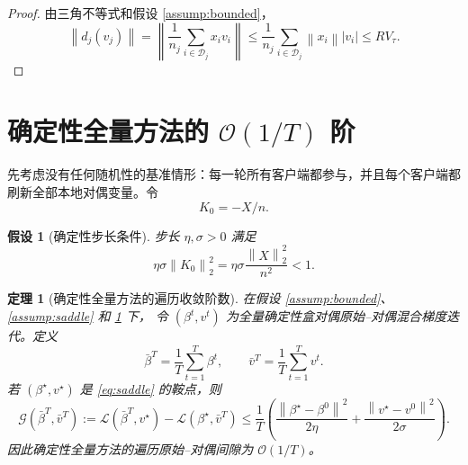 \documentclass[UTF8,a4paper,11pt]{ctexart}
\newtheorem{assumption}{假设}
\newtheorem{theorem}{定理}
\newcommand{\Gap}{\mathcal{G}}
\newcommand{\norm}[1]{\left\|#1\right\|}
\begin{document}
\begin{proof}
由三角不等式和假设 \ref{assump:bounded}，
\[
    \norm{d_j(v_j)}
    =
    \left\|
    \frac{1}{n_j}\sum_{i\in\mathcal{D}_j}x_i v_i
    \right\|
    \le
    \frac{1}{n_j}
    \sum_{i\in\mathcal{D}_j}
    \norm{x_i}|v_i|
    \le
    RV_\tau.
\]
\end{proof}

\section{确定性全量方法的 \texorpdfstring{$\mathcal{O}(1/T)$}{一除以T} 阶}

先考虑没有任何随机性的基准情形：每一轮所有客户端都参与，并且每个客户端都刷新全部本地对偶变量。令
\[
    K_0=-X/n.
\]

\begin{assumption}[确定性步长条件]
\label{assump:det}
步长 $\eta,\sigma>0$ 满足
\begin{equation}
    \eta\sigma \norm{K_0}_2^2
    =
    \eta\sigma \frac{\norm{X}_2^2}{n^2}
    <1.
    \label{eq:det-step}
\end{equation}
\end{assumption}

\begin{theorem}[确定性全量方法的遍历收敛阶数]
\label{thm:det}
在假设 \ref{assump:bounded}、\ref{assump:saddle} 和 \ref{assump:det} 下，
令 $(\beta^t,v^t)$ 为全量确定性盒对偶原始--对偶混合梯度迭代。定义
\[
    \bar{\beta}^T=\frac{1}{T}\sum_{t=1}^T\beta^t,
    \qquad
    \bar{v}^T=\frac{1}{T}\sum_{t=1}^T v^t.
\]
若 $(\beta^\star,v^\star)$ 是 \eqref{eq:saddle} 的鞍点，则
\begin{equation}
    \Gap(\bar{\beta}^T,\bar{v}^T)
    :=
    \mathcal{L}(\bar{\beta}^T,v^\star)
    -
    \mathcal{L}(\beta^\star,\bar{v}^T)
    \le
    \frac{1}{T}
    \left(
        \frac{\norm{\beta^\star-\beta^0}^2}{2\eta}
        +
        \frac{\norm{v^\star-v^0}^2}{2\sigma}
    \right).
    \label{eq:det-rate}
\end{equation}
因此确定性全量方法的遍历原始--对偶间隙为 $\mathcal{O}(1/T)$。
\end{theorem}
\end{document}
